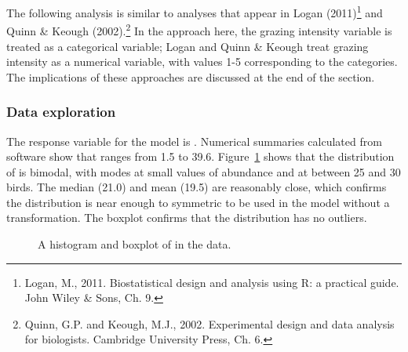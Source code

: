 The following analysis is similar to analyses that appear in Logan (2011)\footnote{Logan, M., 2011. Biostatistical design and analysis using R: a practical guide. John Wiley \& Sons, Ch. 9.} and Quinn \& Keough (2002).\footnote{Quinn, G.P. and Keough, M.J., 2002. Experimental design and data analysis for biologists. Cambridge University Press, Ch. 6.} In the approach here, the grazing intensity variable is treated as a categorical variable; Logan and Quinn \& Keough treat grazing intensity as a numerical variable, with values 1-5 corresponding to the categories. The implications of these approaches are discussed at the end of the section.
 
\subsubsection{Data exploration}

The response variable for the model is . Numerical summaries calculated from software show that  ranges from 1.5 to 39.6. Figure~\ref{forestbirdsAbundanceHistandBox} shows that the distribution of  is bimodal, with modes at small values of abundance and at between 25 and 30 birds. The median (21.0) and mean (19.5) are reasonably close, which confirms the distribution is near enough to symmetric to be used in the model without a transformation. The boxplot confirms that the distribution has no outliers.

	\begin{figure}[h!]
		\centering
		\caption{A histogram  and boxplot  of  in the  data.}
		\label{forestbirdsAbundanceHistandBox}
	\end{figure}	
	
